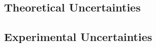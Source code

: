 
\subsection{Theoretical Uncertainties}
\label{subsec:TheoryUnc}

\subsection{Experimental Uncertainties}
\label{subsec:ExpUnc}